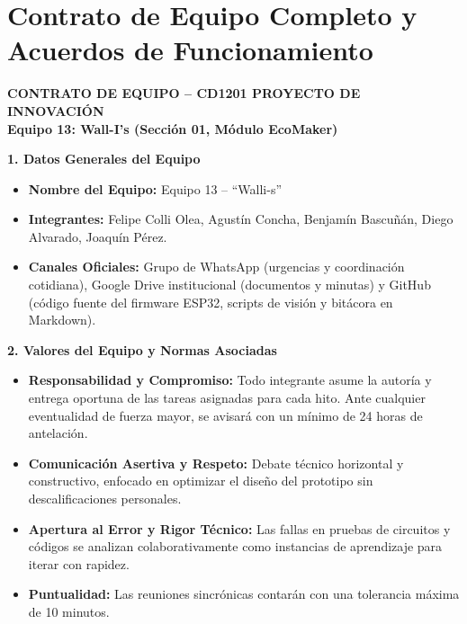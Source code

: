 \documentclass[12pt,letterpaper]{article}
\begin{document}
\section{Contrato de Equipo Completo y Acuerdos de Funcionamiento}
\label{anexo:contrato}

\begin{center}
\textbf{\large CONTRATO DE EQUIPO -- CD1201 PROYECTO DE INNOVACIÓN}\\
\textbf{Equipo 13: Wall-I's (Sección 01, Módulo EcoMaker)}
\end{center}

\vspace{0.2cm}
\noindent\textbf{1. Datos Generales del Equipo}
\begin{itemize}[leftmargin=*, noitemsep]
    \item \textbf{Nombre del Equipo:} Equipo 13 -- ``Walli-s''
    \item \textbf{Integrantes:} Felipe Colli Olea, Agustín Concha, Benjamín Bascuñán, Diego Alvarado, Joaquín Pérez.
    \item \textbf{Canales Oficiales:} Grupo de WhatsApp (urgencias y coordinación cotidiana), Google Drive institucional (documentos y minutas) y GitHub (código fuente del firmware ESP32, scripts de visión y bitácora en Markdown).
\end{itemize}

\vspace{0.2cm}
\noindent\textbf{2. Valores del Equipo y Normas Asociadas}
\begin{itemize}[leftmargin=*, noitemsep]
    \item \textbf{Responsabilidad y Compromiso:} Todo integrante asume la autoría y entrega oportuna de las tareas asignadas para cada hito. Ante cualquier eventualidad de fuerza mayor, se avisará con un mínimo de 24 horas de antelación.
    \item \textbf{Comunicación Asertiva y Respeto:} Debate técnico horizontal y constructivo, enfocado en optimizar el diseño del prototipo sin descalificaciones personales.
    \item \textbf{Apertura al Error y Rigor Técnico:} Las fallas en pruebas de circuitos y códigos se analizan colaborativamente como instancias de aprendizaje para iterar con rapidez.
    \item \textbf{Puntualidad:} Las reuniones sincrónicas contarán con una tolerancia máxima de 10 minutos.
\end{itemize}
\end{document}
